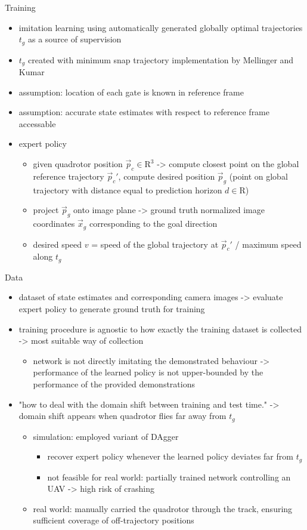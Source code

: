 Training
\begin{itemize}
    \item imitation learning using automatically generated globally optimal trajectories $t_g$ as a source of supervision
    \item $t_g$ created with minimum snap trajectory implementation by Mellinger and Kumar
    \item assumption: location of each gate is known in reference frame
    \item assumption: accurate state estimates with respect to reference frame accessable
    \item expert policy
    \begin{itemize}
        \item given quadrotor position $\vec p_c \in \text{R}^3$ -> compute closest point on the global reference trajectory $\vec p_c'$, 
        compute desired position $\vec p_g$ (point on global trajectory with distance equal to prediction horizon $d\in \text{R}$)
        \item project $\vec p_g$ onto image plane -> ground truth normalized image coordinates $\vec x_g$ corresponding to the goal direction
        \item desired speed $v$ = speed of the global trajectory at $\vec p_c'$ / maximum speed along $t_g$
    \end{itemize}
\end{itemize}

Data
\begin{itemize}
    \item dataset of state estimates and corresponding camera images -> evaluate expert policy to generate ground truth for training
    \item training procedure is agnostic to how exactly the training dataset is collected -> most suitable way of collection
    \begin{itemize}
        \item network is not directly imitating the demonstrated behaviour -> performance of the learned policy is not upper-bounded by the performance
        of the provided demonstrations
    \end{itemize}
    \item "how to deal with the domain shift between training and test time." -> domain shift appears when quadrotor flies far away from $t_g$
    \begin{itemize}
        \item simulation: employed variant of DAgger
        \begin{itemize}
            \item recover expert policy whenever the learned policy deviates far from $t_g$
            \item not feasible for real world: partially trained network controlling an UAV -> high risk of crashing
        \end{itemize}
        \item real world: manually carried the quadrotor through the track, ensuring sufficient coverage of off-trajectory positions
    \end{itemize}
\end{itemize}

